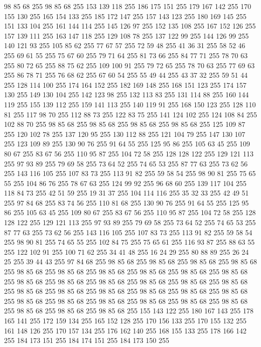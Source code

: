 98 85 68 255 98 85 68 255 153 139 118 255 186 175 151 255 179 167 142 255 170 155 130 255 165 154 133 255 185 172 147 255 157 143 123 255 180 169 145 255 151 133 104 255 161 144 114 255 145 126 97 255 152 135 108 255 167 152 126 255 157 139 111 255 163 147 118 255 129 108 78 255 137 122 99 255 144 126 99 255 140 121 93 255 105 85 62 255 77 67 57 255 72 59 48 255 41 36 31 255 58 52 46 255 69 61 55 255 75 67 60 255 79 71 64 255 81 73 66 255 84 77 71 255 78 70 63 255 80 72 65 255 88 75 62 255 109 100 91 255 79 72 65 255 78 70 63 255 77 69 63 255 86 78 71 255 76 68 62 255 67 60 54 255 55 49 44 255 43 37 32 255 59 51 44 255 128 114 100 255 174 164 152 255 182 169 148 255 168 151 123 255 174 157 130 255 149 130 104 255 142 123 98 255 132 113 83 255 131 114 88 255 160 144 119 255 155 139 112 255 159 141 113 255 140 119 91 255 168 150 123 255 128 110 81 255 117 98 70 255 112 88 73 255 122 83 75 255 141 124 102 255 124 108 84 255
102 88 70 255 98 85 68 255 98 85 68 255 98 85 68 255 98 85 68 255 125 109 87 255 120 102 78 255 137 120 95 255 130 112 88 255 121 104 79 255 147 130 107 255 123 109 89 255 130 90 76 255 91 64 55 255 125 95 86 255 105 63 45 255 109 80 67 255 83 67 56 255 110 95 87 255 104 72 58 255 128 128 122 255 129 121 113 255 97 93 89 255 79 69 58 255 73 64 52 255 74 65 53 255 87 77 63 255 73 62 56 255 143 116 105 255 107 83 73 255 113 91 82 255 59 58 54 255 98 90 81 255 75 65 55 255 104 86 76 255 78 67 63 255 124 99 92 255 96 68 60 255 139 117 104 255 118 84 73 255 42 51 59 255 19 31 37 255 104 114 116 255 35 32 33 255 42 49 51 255 97 84 68 255 83 74 56 255 110 81 68 255 130 90 76 255 91 64 55 255 125 95 86 255 105 63 45 255 109 80 67 255 83 67 56 255 110 95 87 255 104 72 58 255 128 128 122 255 129 121 113 255 97 93 89 255 79 69 58 255 73 64 52 255 74 65 53 255 87 77 63 255 73 62 56 255
143 116 105 255 107 83 73 255 113 91 82 255 59 58 54 255 98 90 81 255 74 65 55 255 102 84 75 255 75 65 61 255 116 93 87 255 88 63 55 255 122 102 91 255 100 71 62 255 34 41 48 255 16 24 29 255 80 88 89 255 26 24 25 255 39 44 43 255 97 84 68 255 98 85 68 255 98 85 68 255 98 85 68 255 98 85 68 255 98 85 68 255 98 85 68 255 98 85 68 255 98 85 68 255 98 85 68 255 98 85 68 255 98 85 68 255 98 85 68 255 98 85 68 255 98 85 68 255 98 85 68 255 98 85 68 255 98 85 68 255 98 85 68 255 98 85 68 255 98 85 68 255 98 85 68 255 98 85 68 255 98 85 68 255 98 85 68 255 98 85 68 255 98 85 68 255 98 85 68 255 98 85 68 255 98 85 68 255 98 85 68 255 98 85 68 255 155 143 122 255 180 167 143 255 178 165 141 255 172 159 134 255 165 152 128 255 170 156 133 255 170 155 132 255 161 148 126 255 170 157 134 255 176 162 140 255 168 155 133 255 178 166 142 255 184 173 151 255 184 174 151 255 184 173 150 255
